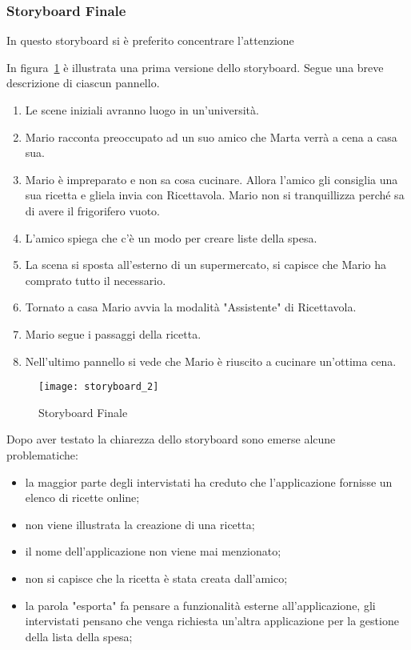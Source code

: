 \subsubsection{Storyboard Finale}

In questo storyboard si è preferito concentrare l'attenzione 

In figura~\ref{fig:storyboard_2} è illustrata una prima versione dello storyboard.
Segue una breve descrizione di ciascun pannello.
\begin{enumerate}
  \item Le scene iniziali avranno luogo in un'università.
  \item Mario racconta preoccupato ad un suo amico che Marta verrà a cena a casa sua.
  \item Mario è impreparato e non sa cosa cucinare.
    Allora l'amico gli consiglia una sua ricetta e gliela invia con Ricettavola.
    Mario non si tranquillizza perché sa di avere il frigorifero vuoto.
  \item L'amico spiega che c'è un modo per creare liste della spesa.
  \item La scena si sposta all'esterno di un supermercato, si capisce che Mario ha comprato tutto il necessario.
  \item Tornato a casa Mario avvia la modalità "Assistente" di Ricettavola.
  \item Mario segue i passaggi della ricetta.
  \item Nell'ultimo pannello si vede che Mario è riuscito a cucinare un'ottima cena.
\end{enumerate}

\clearpage
\begin{figure}[!ht]
  \begin{center}
    \texttt{[image: storyboard\_2]}
    \caption{Storyboard Finale}
    \label{fig:storyboard_2}
  \end{center}
\end{figure}
\clearpage

Dopo aver testato la chiarezza dello storyboard sono emerse alcune problematiche:
\begin{itemize}
  \item la maggior parte degli intervistati ha creduto che l'applicazione fornisse un elenco di ricette online;

  \item non viene illustrata la creazione di una ricetta;

  \item il nome dell'applicazione non viene mai menzionato;

  \item non si capisce che la ricetta è stata creata dall'amico;

  \item la parola "esporta" fa pensare a funzionalità esterne all'applicazione, gli intervistati pensano che venga richiesta un'altra applicazione per la gestione della lista della spesa;
\end{itemize}




